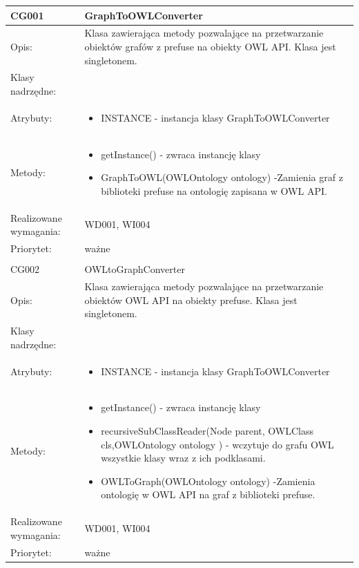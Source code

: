 \begin{center}
 


\begin{longtable}{|m{3cm}|m{9cm}|} \hline

CG001 & GraphToOWLConverter \\ \hline
Opis: & Klasa zawierająca metody pozwalające na przetwarzanie obiektów grafów z prefuse na obiekty OWL API. Klasa jest singletonem. \\ \hline
Klasy nadrzędne: &     \\ \hline
Atrybuty: & \begin{itemize}
 \item INSTANCE - instancja klasy GraphToOWLConverter 
\end{itemize}
 \\ \hline
Metody: & \begin{itemize}
	\item getInstance() - zwraca instancję klasy
	\item GraphToOWL(OWLOntology ontology) -Zamienia graf z biblioteki prefuse na ontologię zapisana w OWL API.
\end{itemize}
  \\ \hline
Realizowane wymagania: & WD001, WI004 \\ \hline
Priorytet: & ważne  \\ \hline

\multicolumn{2}{c}{} \\
 \hline

CG002 & OWLtoGraphConverter \\ \hline
Opis: & Klasa zawierająca metody pozwalające na przetwarzanie obiektów OWL API na obiekty prefuse. Klasa jest singletonem.\\ \hline
Klasy nadrzędne: &     \\ \hline
Atrybuty: & \begin{itemize}
 \item INSTANCE - instancja klasy GraphToOWLConverter 
\end{itemize}
 \\ \hline
Metody: & \begin{itemize}
	\item getInstance() - zwraca instancję klasy
	\item recursiveSubClassReader(Node parent, OWLClass cls,OWLOntology ontology ) - wczytuje do grafu OWL wszystkie klasy wraz z ich podklasami.
 	\item OWLToGraph(OWLOntology ontology) -Zamienia ontologię w OWL API na graf z biblioteki prefuse.
\end{itemize}
  \\ \hline
Realizowane wymagania: & WD001, WI004 \\ \hline
Priorytet: & ważne  \\ \hline



\end{longtable}

\end{center}



